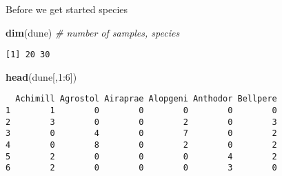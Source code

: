 \documentclass[10pt,ignorenonframetext,compress, aspectratio=169]{beamer}
\newenvironment{Shaded}{\begin{snugshade}}{\end{snugshade}}
\newcommand{\KeywordTok}[1]{\textcolor[rgb]{0.13,0.29,0.53}{\textbf{{#1}}}}
\newcommand{\DecValTok}[1]{\textcolor[rgb]{0.00,0.00,0.81}{{#1}}}
\newcommand{\CommentTok}[1]{\textcolor[rgb]{0.56,0.35,0.01}{\textit{{#1}}}}
\newcommand{\NormalTok}[1]{{#1}}
\begin{document}
\begin{frame}[fragile]{Before we get started \textbar{} species}

\begin{Shaded}
\begin{Highlighting}[]
\KeywordTok{dim}\NormalTok{(dune)                               }\CommentTok{# number of samples, species}
\end{Highlighting}
\end{Shaded}

\begin{verbatim}
[1] 20 30
\end{verbatim}

\begin{Shaded}
\begin{Highlighting}[]
\KeywordTok{head}\NormalTok{(dune[,}\DecValTok{1}\NormalTok{:}\DecValTok{6}\NormalTok{])}
\end{Highlighting}
\end{Shaded}

\begin{verbatim}
  Achimill Agrostol Airaprae Alopgeni Anthodor Bellpere
1        1        0        0        0        0        0
2        3        0        0        2        0        3
3        0        4        0        7        0        2
4        0        8        0        2        0        2
5        2        0        0        0        4        2
6        2        0        0        0        3        0
\end{verbatim}

\end{frame}
\end{document}
